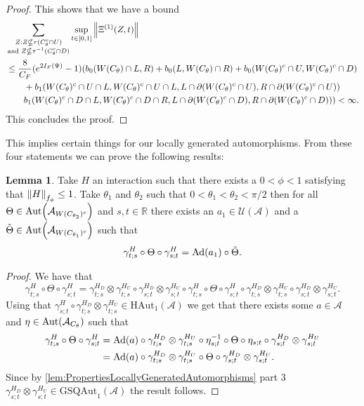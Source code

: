\documentclass[12pt,a4paper,twoside]{article}
\let\originalleft\left
\let\originalright\right
\renewcommand{\left}{\mathopen{}\mathclose\bgroup\originalleft}
\renewcommand{\right}{\aftergroup\egroup\originalright}
\newcommand{\UU}{\mathcal U}
\renewcommand{\AA}{\mathcal A}
\newcommand{\RR}{\mathbb R}
\newcommand{\Ad}[1]{\textrm{Ad}\left(#1\right)}
\newcommand{\Aut}[1]{\textrm{Aut}\left(#1\right)}
\theoremstyle{definition}
\newtheorem{lemma}[theorem]{Lemma}
\numberwithin{equation}{section}
\begin{document}
\begin{proof}
	This shows that we have a bound
	\begin{align}
		&\sum_{\substack{Z:Z\nsubseteq \tau(C_\theta^c\cap U)\\\text{and }Z\nsubseteq \tau^{-1}(C_\theta^c\cap D)}}\sup_{t\in[0,1]}\norm{\Xi^{(1)}(Z,t)}\\
		\nonumber
		&\leq \frac{8}{C_F}(e^{2I_F(\Psi)}-1)(b_0(W(C_\theta)\cap L,R)+b_0(L,W(C_\theta)\cap R)+b_0(W(C_\theta)^c\cap U,W(C_\theta)^c\cap D)\\
		\nonumber
		&\qquad+b_1(W(C_\theta)^c\cap U\cap L,W(C_\theta)^c\cap U\cap L,L\cap\partial(W(C_\theta)^c\cap U),R\cap\partial(W(C_\theta)^c\cap U))\\
		&\qquad b_1(W(C_\theta)^c\cap D\cap L,W(C_\theta)^c\cap D\cap R,L\cap\partial(W(C_\theta)^c\cap D),R\cap\partial(W(C_\theta)^c\cap D)))<\infty.
	\end{align}
	This concludes the proof.
\end{proof}
This implies certain things for our locally generated automorphisms.
From these four statements we can prove the following results:
\begin{lemma}\label{lem:TwoAngleLemmaPart1}
	Take $H$ an interaction such that there exists a $0<\phi<1$ satisfying that $\norm{H}_{f_\phi}\leq 1$. Take $\theta_1$ and $\theta_2$ such that $0<\theta_1<\theta_2<\pi/2$ then for all $\Theta\in\Aut{\AA_{W(C_{\theta_2})^c}}$ and $s,t\in\RR$ there exists an $a_1\in\UU(\AA)$ and a $\tilde{\Theta}\in \Aut{\AA_{W(C_{\theta_1})^c}}$ such that
	\begin{equation}\label{eq:TwoAngleLemmaPart1Equation1}
		\gamma^{H}_{t;s}\circ\Theta\circ\gamma^{H}_{s;t}=\Ad{a_1}\circ\tilde{\Theta}.
	\end{equation}
\end{lemma}
\begin{proof}
	We have that
	\begin{equation}
		\gamma^{H}_{t;s}\circ\Theta\circ\gamma^{H}_{s;t}=\gamma^{H_D}_{t;s}\otimes\gamma^{H_U}_{t;s}\circ\gamma^{H_D}_{s;t}\otimes\gamma^{H_U}_{s;t}\circ\gamma^{H}_{t;s}\circ\Theta\circ\gamma^{H}_{s;t}\circ\gamma^{H_D}_{t;s}\otimes\gamma^{H_U}_{t;s}\circ\gamma^{H_D}_{s;t}\otimes\gamma^{H_U}_{s;t}.
	\end{equation}
	Using that $\gamma^{H}_{s;t}\circ\gamma^{H_D}_{t;s}\otimes\gamma^{H_U}_{t;s}\in\textrm{HAut}_1(\AA)$ we get that there exists some $a\in\AA$ and $\eta\in\Aut{\AA_{C_\theta}}$ such that
	\begin{align}
		\gamma^{H}_{t;s}\circ\Theta\circ\gamma^{H}_{s;t}&=\Ad{a}\circ \gamma^{H_D}_{t;s}\otimes\gamma^{H_U}_{t;s}\circ\eta_{s;t}^{-1}\circ\Theta\circ\eta_{s;t}\circ\gamma^{H_D}_{s;t}\otimes\gamma^{H_U}_{s;t}\\
		&=\Ad{a}\circ \gamma^{H_D}_{t;s}\otimes\gamma^{H_U}_{t;s}\circ\Theta\circ\gamma^{H_D}_{s;t}\otimes\gamma^{H_U}_{s;t}.
	\end{align}
	Since by \ref{lem:PropertiesLocallyGeneratedAutomorphisms} part 3 $\gamma^{H_D}_{s;t}\otimes\gamma^{H_U}_{s;t}\in\textrm{GSQAut}_1(\AA)$ the result follows.
\end{proof}
\end{document}
